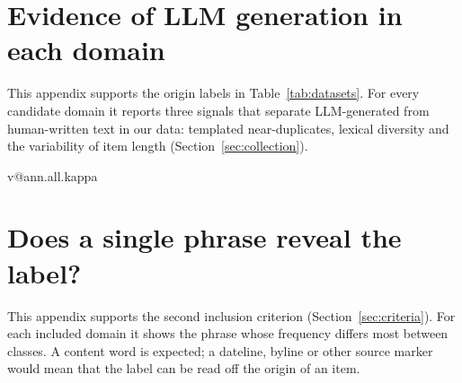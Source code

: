 \documentclass[acmsmall,screen]{acmart}
\makeatletter
\newcommand{\ifannotated}[2]{\ifcsname v@ann.all.kappa\endcsname#1\else#2\fi}
\makeatother
\begin{document}
\section{Evidence of LLM generation in each domain}\label{app:synth}
This appendix supports the origin labels in Table~\ref{tab:datasets}. For every candidate domain it reports three signals that separate LLM-generated from human-written text in our data: templated near-duplicates, lexical diversity and the variability of item length (Section~\ref{sec:collection}).
\begin{table}[H]\centering\scriptsize
\caption{Generation signals for all \NumDomainsVten{} candidate domains (train and test pooled). Counts ($N$) are for the candidate pool before the removals described in Sections~\ref{sec:criteria} and~\ref{sec:splits}, so they exceed the totals in Table~\ref{tab:datasets}. Template\,\%: items with a near-duplicate variant (character 5-gram Jaccard $\geq 0.8$) inside the domain. Distinct-2: distinct word bigrams per bigram in a 500-item sample. Len.\,CV: coefficient of variation of item length in words. Seed\,\%: items near-duplicating an item of another domain of the same script. QA items are question--answer pairs, whose shared questions raise Template\,\% by construction.}
\label{tab:synth-audit}
\resizebox{\textwidth}{!}{}
\end{table}
\ifannotated{%
\begin{table}[H]\centering\small
\caption{Second-annotator check of the generated domains (Section~\ref{sec:collection}): a stratified sample of 30 test items per domain, labelled without access to the original labels. Agreement and Cohen's $\kappa$ are computed against the original labels; three items left blank by the annotator are excluded.}
\label{tab:annotation}

\end{table}}{}

\clearpage
\section{Does a single phrase reveal the label?}\label{app:shortcuts}
This appendix supports the second inclusion criterion (Section~\ref{sec:criteria}). For each included domain it shows the phrase whose frequency differs most between classes. A content word is expected; a dateline, byline or other source marker would mean that the label can be read off the origin of an item.
\begin{table}[H]\centering\scriptsize
\caption{For every included domain, the word n-gram ($n\leq3$, at least 20 occurrences) with the largest difference in document frequency between one class and the others. Content words are expected; source boilerplate (datelines, bylines) would indicate that the label follows the origin of an item.}
\label{tab:shortcuts}

\end{table}
\end{document}
